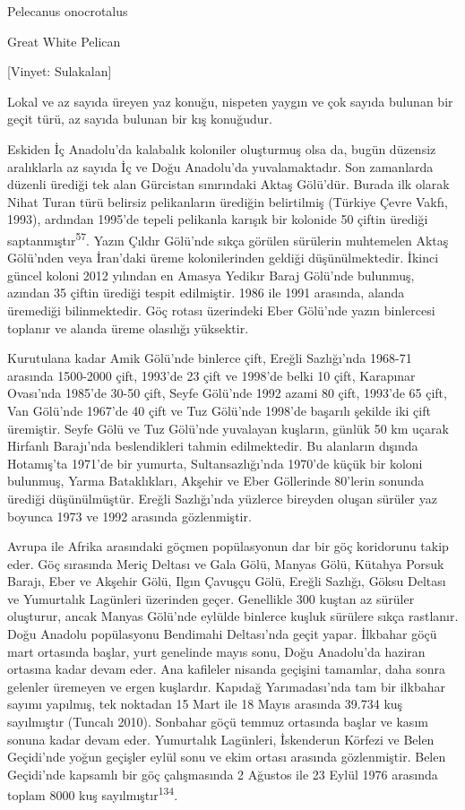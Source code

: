 \documentclass[
  letterpaper,
  DIV=11,
  numbers=noendperiod]{scrreprt}
\begin{document}
Pelecanus onocrotalus

Great White Pelican

{[}Vinyet: Sulakalan{]}

Lokal ve az sayıda üreyen yaz konuğu, nispeten yaygın ve çok sayıda
bulunan bir geçit türü, az sayıda bulunan bir kış konuğudur.

Eskiden İç Anadolu'da kalabalık koloniler oluşturmuş olsa da, bugün
düzensiz aralıklarla az sayıda İç ve Doğu Anadolu'da yuvalamaktadır. Son
zamanlarda düzenli ürediği tek alan Gürcistan sınırındaki Aktaş
Gölü'dür. Burada ilk olarak Nihat Turan türü belirsiz pelikanların
ürediğin belirtilmiş (Türkiye Çevre Vakfı, 1993), ardından 1995'de
tepeli pelikanla karışık bir kolonide 50 çiftin ürediği
saptanmıştır\textsuperscript{57}. Yazın Çıldır Gölü'nde sıkça görülen
sürülerin muhtemelen Aktaş Gölü'nden veya İran'daki üreme kolonilerinden
geldiği düşünülmektedir. İkinci güncel koloni 2012 yılından en Amasya
Yedikır Baraj Gölü'nde bulunmuş, azından 35 çiftin ürediği tespit
edilmiştir. 1986 ile 1991 arasında, alanda üremediği bilinmektedir. Göç
rotası üzerindeki Eber Gölü'nde yazın binlercesi toplanır ve alanda
üreme olasılığı yüksektir.

Kurutulana kadar Amik Gölü'nde binlerce çift, Ereğli Sazlığı'nda 1968-71
arasında 1500-2000 çift, 1993'de 23 çift ve 1998'de belki 10 çift,
Karapınar Ovası'nda 1985'de 30-50 çift, Seyfe Gölü'nde 1992 azami 80
çift, 1993'de 65 çift, Van Gölü'nde 1967'de 40 çift ve Tuz Gölü'nde
1998'de başarılı şekilde iki çift üremiştir. Seyfe Gölü ve Tuz Gölü'nde
yuvalayan kuşların, günlük 50 km uçarak Hirfanlı Barajı'nda
beslendikleri tahmin edilmektedir. Bu alanların dışında Hotamış'ta
1971'de bir yumurta, Sultansazlığı'nda 1970'de küçük bir koloni
bulunmuş, Yarma Bataklıkları, Akşehir ve Eber Göllerinde 80'lerin
sonunda ürediği düşünülmüştür. Ereğli Sazlığı'nda yüzlerce bireyden
oluşan sürüler yaz boyunca 1973 ve 1992 arasında gözlenmiştir.

Avrupa ile Afrika arasındaki göçmen popülasyonun dar bir göç koridorunu
takip eder. Göç sırasında Meriç Deltası ve Gala Gölü, Manyas Gölü,
Kütahya Porsuk Barajı, Eber ve Akşehir Gölü, Ilgın Çavuşçu Gölü, Ereğli
Sazlığı, Göksu Deltası ve Yumurtalık Lagünleri üzerinden geçer.
Genellikle 300 kuştan az sürüler oluşturur, ancak Manyas Gölü'nde
eylülde binlerce kuşluk sürülere sıkça rastlanır. Doğu Anadolu
popülasyonu Bendimahi Deltası'nda geçit yapar. İlkbahar göçü mart
ortasında başlar, yurt genelinde mayıs sonu, Doğu Anadolu'da haziran
ortasına kadar devam eder. Ana kafileler nisanda geçişini tamamlar, daha
sonra gelenler üremeyen ve ergen kuşlardır. Kapıdağ Yarımadası'nda tam
bir ilkbahar sayımı yapılmış, tek noktadan 15 Mart ile 18 Mayıs arasında
39.734 kuş sayılmıştır (Tuncalı 2010). Sonbahar göçü temmuz ortasında
başlar ve kasım sonuna kadar devam eder. Yumurtalık Lagünleri,
İskenderun Körfezi ve Belen Geçidi'nde yoğun geçişler eylül sonu ve ekim
ortası arasında gözlenmiştir. Belen Geçidi'nde kapsamlı bir göç
çalışmasında 2 Ağustos ile 23 Eylül 1976 arasında toplam 8000 kuş
sayılmıştır\textsuperscript{134}.
\end{document}
